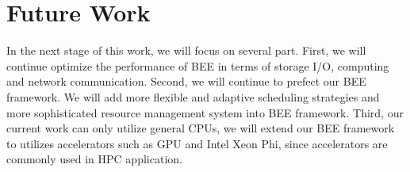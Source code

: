 \section{Future Work}
    \label{sec:discussion}
In the next stage of this work, we will focus on several part. First, we will continue optimize the performance of BEE in terms of storage I/O, computing and network communication. Second, we will continue to prefect our BEE framework. We will add more flexible and adaptive scheduling strategies and more sophisticated resource management system into BEE framework. Third, our current work can only utilize general CPUs, we will extend our BEE framework to utilizes accelerators such as GPU and Intel Xeon Phi, since accelerators are commonly used in HPC application. 